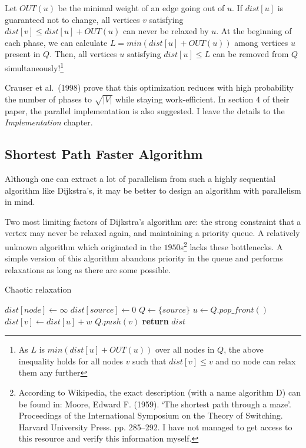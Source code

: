 \documentclass[12pt,a4paper,oneside,openright]{report}
\begin{document}
Let $OUT(u)$ be the minimal weight of an edge going out of $u$. If $dist[u]$ is guaranteed not to change, all vertices $v$ satisfying $dist[v] \leq dist[u] + OUT(u)$ can never be relaxed by $u$. At the beginning of each phase, we can calculate $L = min(dist[u] + OUT(u))$ among vertices $u$ present in $Q$. Then, all vertices $u$ satisfying $dist[u] \leq L$ can be removed from $Q$ simultaneously!\footnote{As $L$ is $min(dist[u] + OUT(u))$ over all nodes in $Q$, the above inequality holds for all nodes $v$ such that $dist[v]\leq v$ and no node can relax them any further}

Crauser et al.~(1998)\cite{dijkstra} prove that this optimization reduces with high probability the number of phases to $\sqrt{|V|}$ while staying work-efficient. In section $4$ of their paper, the parallel implementation is also suggested. I leave the details to the \textit{Implementation} chapter.

\subsection{Shortest Path Faster Algorithm}
Although one can extract a lot of parallelism from such a highly sequential algorithm like Dijkstra's, it may be better to design an algorithm with parallelism in mind. 

Two most limiting factors of Dijkstra's algorithm are: the strong constraint that a vertex may never be relaxed again, and maintaining a priority queue. A relatively unknown algorithm which originated in the $1950$s\footnote{According to Wikipedia, the exact description (with a name algorithm D) can be found in:  Moore, Edward F. (1959).  `The shortest path through a maze'.  Proceedings of the International Symposium on the Theory of Switching.  Harvard University Press.  pp.  285–292. I have not managed to get access to this resource and verify this information myself.} lacks these bottlenecks. A simple version of this algorithm abandons priority in the queue and performs relaxations as long as there are some possible.

\begin{algorithm}
\caption{Chaotic relaxation}\label{chaotic}
\begin{algorithmic}[1]
    \State $dist[node] \gets \infty$
\EndFor
\State $dist[source] \gets 0$
\State $Q \gets \{source\}$ 
        \State $u \gets Q.pop\_front()$
            \State $dist[v] \gets dist[u] + w$
            \State $Q.push(v)$
        \EndIf
      \EndFor
    \EndWhile
\State \textbf{return} $dist$
\EndProcedure
\end{algorithmic}
\end{algorithm}
\end{document}
